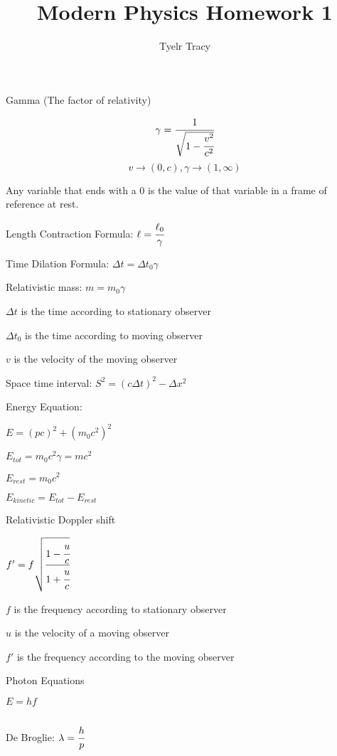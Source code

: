 \documentclass{article}
\title{Modern Physics Homework 1}
\author{Tyelr Tracy}
\begin{document}
Gamma (The factor of relativity)

$$ \gamma = \cfrac{1}{\sqrt{1 - \cfrac{v^2}{c^2}}} $$
$$ v \rightarrow (0, c), \gamma \rightarrow (1, \infty) $$

Any variable that ends with a 0 is the value of that variable in a frame of reference at rest.


Length Contraction Formula: $\ell = \cfrac{\ell_0}{\gamma}$

Time Dilation Formula: $\Delta t = \Delta t_0 \gamma$

Relativistic mass: $m = m_0 \gamma$

\hspace*{10mm} $\Delta t$ is the time according to stationary observer

\hspace*{10mm} $\Delta t_0$ is the time according to moving observer

\hspace*{10mm} $v$ is the velocity of the moving observer




Space time interval: $S^2 =  (c \Delta t)^2 - \Delta x^2 $


Energy Equation:

$E = (pc)^2 + (m_0c^2)^2$

$E_{tot} = m_0c^2\gamma = mc^2$

$E_{rest} = m_0c^2$

$E_{kinetic} = E_{tot} - E_{rest}$



Relativistic Doppler shift

$f' = f \sqrt{\cfrac{1- \cfrac{u}{c}}{1 + \cfrac{u}{c}}}$

\hspace*{10mm} $f$ is the frequency according to stationary observer

\hspace*{10mm} $u$ is the velocity of a moving observer

\hspace*{10mm} $f'$ is the frequency according to the moving observer


Photon Equations

$E = hf$

$  $


De Broglie: $ \lambda = \cfrac{h}{p} $
\end{document}
